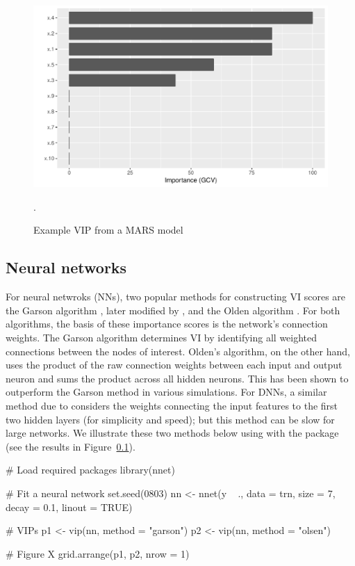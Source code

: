 \begin{figure}[!htb]
  \centering 
  \includegraphics[width=1\linewidth]{figures/vip-earth} 
  \caption{Example VIP from a MARS model}.
  \label{fig:vip-earth}
\end{figure}

\subsection{Neural networks}

For neural netwroks (NNs), two popular methods for constructing VI scores are the Garson algorithm \citep{interpreting-garson-1991}, later modified by \citet{back-goh-1995}, and the Olden algorithm \citep{accurate-olden-2004}. For both algorithms, the basis of these importance scores is the network’s connection weights. The Garson algorithm determines VI by identifying all weighted connections between the nodes of interest. Olden’s algorithm, on the other hand, uses the product of the raw connection weights between each input and output neuron and sums the product across all hidden neurons. This has been shown to outperform the Garson method in various simulations. For DNNs, a similar method due to \citet{data-gedeon-1997} considers the weights connecting the input features to the first two hidden layers (for simplicity and speed); but this method can be slow for large networks. We illustrate these two methods below using  with the  package \citep{nnet-pkg} (see the results in Figure~\ref{}).


\begin{example}
# Load required packages
library(nnet)

# Fit a neural network
set.seed(0803)
nn <- nnet(y ~ ., data = trn, size = 7, decay = 0.1, linout = TRUE)

# VIPs
p1 <- vip(nn, method = "garson")
p2 <- vip(nn, method = "olsen")

# Figure X
grid.arrange(p1, p2, nrow = 1)
\end{example}


